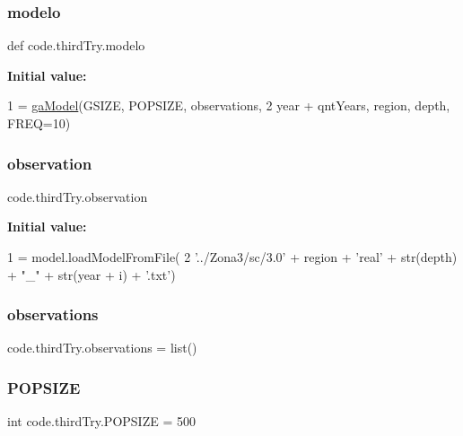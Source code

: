 \subsubsection{\texorpdfstring{modelo}{modelo}}
{\footnotesize\ttfamily def code.\+third\+Try.\+modelo}

{\bfseries Initial value\+:}
\begin{DoxyCode}
1 =  \hyperlink{namespacecode_1_1third_try_af5f0d516268ea4b8717680aff6e9f789}{gaModel}(GSIZE, POPSIZE, observations,
2                                  year + qntYears, region, depth, FREQ=10)
\end{DoxyCode}
\mbox{\label{namespacecode_1_1third_try_adf92af06f00b952e7e9370bc2cacfad0}} 
\subsubsection{\texorpdfstring{observation}{observation}}
{\footnotesize\ttfamily code.\+third\+Try.\+observation}

{\bfseries Initial value\+:}
\begin{DoxyCode}
1 =  model.loadModelFromFile(
2                     \textcolor{stringliteral}{'../Zona3/sc/3.0'} + region + \textcolor{stringliteral}{'real'} + str(depth) + \textcolor{stringliteral}{"\_"} + str(year + i) + \textcolor{stringliteral}{'.txt'})
\end{DoxyCode}
\mbox{\label{namespacecode_1_1third_try_a085cfa54975ca52de2df7f0a8c3aba61}} 
\subsubsection{\texorpdfstring{observations}{observations}}
{\footnotesize\ttfamily code.\+third\+Try.\+observations = list()}

\mbox{\label{namespacecode_1_1third_try_af536d014156756dc7a67ad6bd1d9328f}} 
\subsubsection{\texorpdfstring{P\+O\+P\+S\+I\+ZE}{POPSIZE}}
{\footnotesize\ttfamily int code.\+third\+Try.\+P\+O\+P\+S\+I\+ZE = 500}

